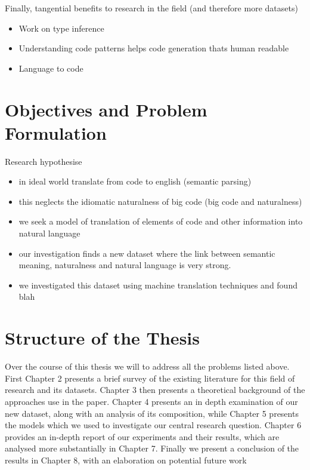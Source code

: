 Finally, tangential benefits to research in the field (and therefore more datasets)

\begin{itemize}
    \item Work on type inference
    \item Understanding code patterns helps code generation thats human readable
    \item Language to code
\end{itemize}



\section{Objectives and Problem Formulation} %
\label{sec:problem_formulation}

Research hypothesise

\begin{itemize}
    \item in ideal world translate from code to english (semantic parsing)
    \item this neglects the idiomatic naturalness of big code (big code and naturalness)
    \item we seek a model of translation of elements of code and other information into natural language
    \item our investigation finds a new dataset where the link between semantic meaning, naturalness and natural language is very strong. 
    \item we investigated this dataset using machine translation techniques and found blah
\end{itemize}
 

\section{Structure of the Thesis} %
\label{sec:structure_of_the_thesis}

Over the course of this thesis we will to address all the problems listed above.
First Chapter 2 presents a brief survey of the existing literature for this field of research and its datasets.
Chapter 3 then presents a theoretical background of the approaches use in the paper. 
Chapter 4 presents an in depth examination of our new dataset, along with an analysis of its composition, while Chapter 5 presents the models which we used to investigate our central research question. 
Chapter 6 provides an in-depth report of our experiments and their results, which are analysed more substantially in Chapter 7. 
Finally we present a conclusion of the results in Chapter 8, with an elaboration on potential future work



